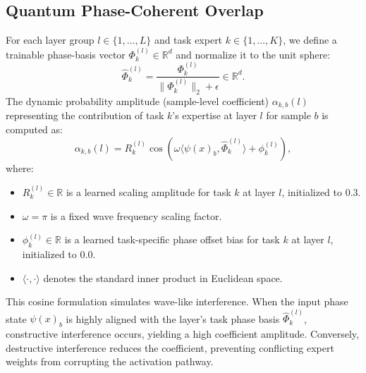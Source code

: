 \subsection{Quantum Phase-Coherent Overlap}
For each layer group $l \in \{1, \dots, L\}$ and task expert $k \in \{1, \dots, K\}$, we define a trainable phase-basis vector $\Phi_k^{(l)} \in \mathbb{R}^d$ and normalize it to the unit sphere:
\begin{equation}
    \hat{\Phi}_k^{(l)} = \frac{\Phi_k^{(l)}}{\|\Phi_k^{(l)}\|_2 + \epsilon} \in \mathbb{R}^d.
\end{equation}
The dynamic probability amplitude (sample-level coefficient) $\alpha_{k, b}(l)$ representing the contribution of task $k$'s expertise at layer $l$ for sample $b$ is computed as:
\begin{equation}
    \alpha_{k, b}(l) = R_k^{(l)} \cos\left( \omega \langle \psi(x)_b, \hat{\Phi}_k^{(l)} \rangle + \phi_k^{(l)} \right),
\end{equation}
where:
\begin{itemize}
    \item $R_k^{(l)} \in \mathbb{R}$ is a learned scaling amplitude for task $k$ at layer $l$, initialized to $0.3$.
    \item $\omega = \pi$ is a fixed wave frequency scaling factor.
    \item $\phi_k^{(l)} \in \mathbb{R}$ is a learned task-specific phase offset bias for task $k$ at layer $l$, initialized to $0.0$.
    \item $\langle \cdot, \cdot \rangle$ denotes the standard inner product in Euclidean space.
\end{itemize}
This cosine formulation simulates wave-like interference. When the input phase state $\psi(x)_b$ is highly aligned with the layer's task phase basis $\hat{\Phi}_k^{(l)}$, constructive interference occurs, yielding a high coefficient amplitude. Conversely, destructive interference reduces the coefficient, preventing conflicting expert weights from corrupting the activation pathway.

